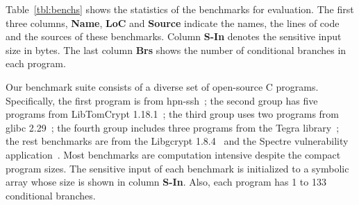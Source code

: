 \documentclass[sigconf]{acmart}
\begin{document}
Table~\ref{tbl:benchs} shows the statistics of the benchmarks for evaluation.  
The first three columns, \textbf{Name}, \textbf{LoC} and \textbf{Source} 
indicate the names, the lines of code and the sources of these benchmarks. 
Column \textbf{S-In} denotes the sensitive input size in bytes. The last 
column \textbf{Brs} shows the number of conditional branches in each program.


Our benchmark suite consists of a diverse set of open-source C programs. 
Specifically, the first program is from hpn-ssh~\cite{hpn-ssh}; the second 
group has five programs from LibTomCrypt 1.18.1~\cite{LibTomCrypt}; the 
third group uses two programs from glibc 2.29~\cite{glibc}; the fourth
group includes three programs from the Tegra library~\cite{Tegra}; the 
rest benchmarks are from the Libgcrypt 1.8.4~\cite{Libgcrypt} and the 
Spectre vulnerability application~\cite{spectre-attack}. Most benchmarks 
are computation intensive despite the compact program sizes. The sensitive 
input of each benchmark is initialized to a symbolic array whose size is 
shown in column \textbf{S-In}. Also, each program has 1 to 133 conditional 
branches.
\end{document}
